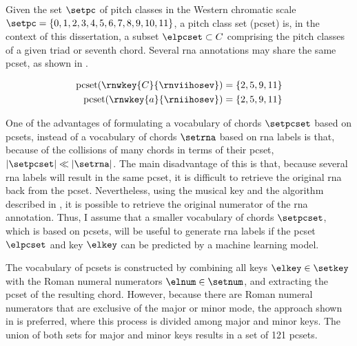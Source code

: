 
Given the set $\setpc$ of pitch classes in the Western
chromatic scale $\setpc = \{0, 1, 2, 3, 4, 5, 6, 7, 8, 9,
10, 11 \}$, a pitch class set (\gls{pcset}) is, in the
context of this dissertation, a subset $\elpcset \subset C$
comprising the pitch classes of a given triad or seventh
chord. Several \gls{rna} annotations may share the same
\gls{pcset}, as shown in .

\begin{equation}
    \label{eq:pcset_collision}
    \begin{split}
        \text{pcset}(\rnwkey{C}{\rnviihosev}) &= \{2, 5, 9, 11 \}\\
        \text{pcset}(\rnwkey{a}{\rniihosev}) &= \{2, 5, 9, 11 \}
    \end{split}
\end{equation}

One of the advantages of formulating a vocabulary of chords
$\setpcset$ based on \gls{pcset}s, instead of a vocabulary
of chords $\setrna$ based on \gls{rna} labels is that,
because of the collisions of many chords in terms of their
\gls{pcset}, $| \setpcset | \ll | \setrna |$. The main
disadvantage of this is that, because several \gls{rna}
labels will result in the same \gls{pcset}, it is difficult
to retrieve the original \gls{rna} back from the
\gls{pcset}. Nevertheless, using the musical key and the
algorithm described in
,
it is possible to retrieve the original numerator of the
\gls{rna} annotation. Thus, I assume that a smaller
vocabulary of chords $\setpcset$, which is based on
\gls{pcset}s, will be useful to generate \gls{rna} labels if
the \gls{pcset} $\elpcset$ and key $\elkey$ can be predicted
by a machine learning model.

The vocabulary of \gls{pcset}s is constructed by combining
all keys $\elkey \in \setkey$ with the Roman numeral
numerators $\elnum \in \setnum$, and extracting the
\gls{pcset} of the resulting chord. However, because there
are Roman numeral numerators that are exclusive of the major
or minor mode, the approach shown in  is
preferred, where this process is divided among major and
minor keys. The union of both sets for major and minor keys
results in a set of 121 \gls{pcset}s.


